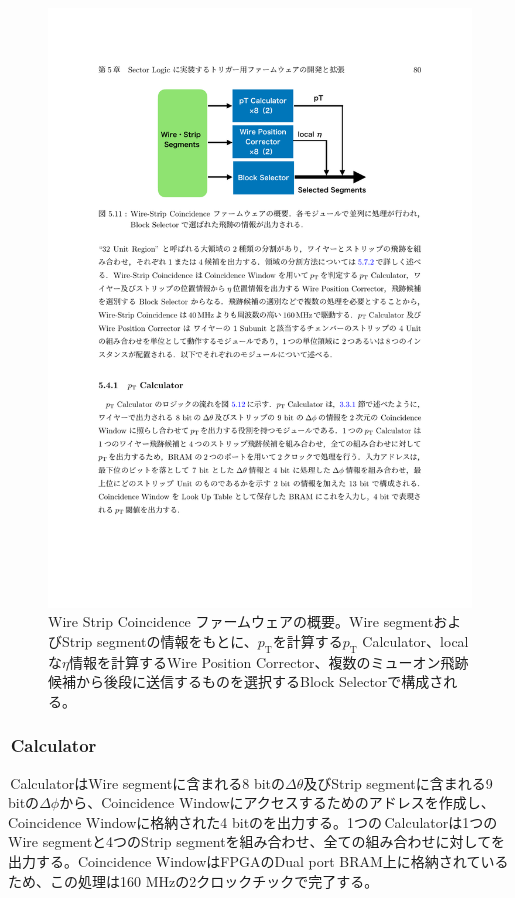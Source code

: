 \begin{figure} 
\centering
\includegraphics[width=16cm]{fig/SL/WS_logic.pdf}
\caption[Wire Strip Coincidence ファームウェアの概要]{Wire Strip Coincidence ファームウェアの概要\cite{mt_kawamoto}。Wire segmentおよびStrip segmentの情報をもとに、$p_\mathrm{T}$を計算する$p_\mathrm{T}$ Calculator、localな$\eta$情報を計算するWire Position Corrector、複数のミューオン飛跡候補から後段に送信するものを選択するBlock Selectorで構成される。}
\label{WS_logic}
\end{figure}

\subsubsection*{\pt\,Calculator}
\pt\,CalculatorはWire segmentに含まれる8 bitの$\Delta\theta$及びStrip segmentに含まれる9 bitの$\Delta\phi$から、Coincidence Windowにアクセスするためのアドレスを作成し、Coincidence Windowに格納された4 bitの\pt を出力する。1つの\pt\,Calculatorは1つのWire segmentと4つのStrip segmentを組み合わせ、全ての組み合わせに対して\pt を出力する。Coincidence WindowはFPGAのDual port BRAM上に格納されているため、この処理は160 MHzの2クロックチックで完了する。

